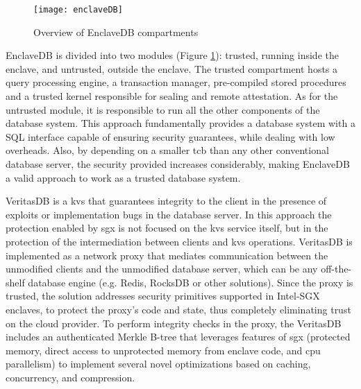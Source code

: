 \begin{figure}[htbp]
	\centering
	{\texttt{[image: enclaveDB]}}
	\caption{Overview of EnclaveDB compartments}
	\label{fig:enclaveDB}
\end{figure}
 
EnclaveDB is divided into two modules (Figure \ref{fig:enclaveDB}): trusted, running inside the enclave, and untrusted, outside the enclave. The trusted compartment hosts a query processing engine, a transaction manager, pre-compiled stored procedures and a trusted kernel responsible for sealing and remote attestation. As for the untrusted module, it is responsible to run all the other components of the database system. 
This approach fundamentally provides a database system with a SQL interface capable of ensuring security guarantees, while dealing with low overheads. Also, by depending on a smaller \gls{tcb} than any other conventional database server, the security provided increases considerably, making EnclaveDB a valid approach to work as a trusted database system.

VeritasDB \cite{veritasDB} is a \gls{kvs} that guarantees integrity to the client in the presence of exploits or implementation bugs in the database server. In this approach the protection enabled by \gls{sgx} is not focused on the \gls{kvs} service itself, but in the protection of the intermediation between clients and \gls{kvs} operations. VeritasDB is implemented as a network proxy that mediates communication between the unmodified clients and the unmodified database server, which can be any off-the-shelf database engine (e.g. Redis, RocksDB or other solutions). Since the proxy is trusted, the solution addresses security primitives supported in Intel-SGX enclaves, to protect the proxy’s code and state, thus completely eliminating trust on the cloud provider. To perform integrity checks in the proxy, the VeritasDB includes an authenticated Merkle B-tree that leverages features of \gls{sgx} (protected memory, direct access to unprotected memory from enclave code, and \gls{cpu} parallelism) to implement several novel optimizations based on caching, concurrency, and compression.

